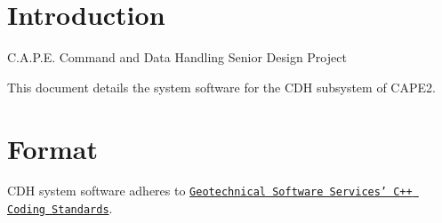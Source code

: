 \hypertarget{index_intro}{}\section{Introduction}\label{index_intro}
C.A.P.E. Command and Data Handling Senior Design Project

This document details the system software for the CDH subsystem of CAPE2.\hypertarget{index_format}{}\section{Format}\label{index_format}
CDH system software adheres to \href{http://geosoft.no/development/cppstyle.html}{\tt Geotechnical Software Services' C++ Coding Standards}. 